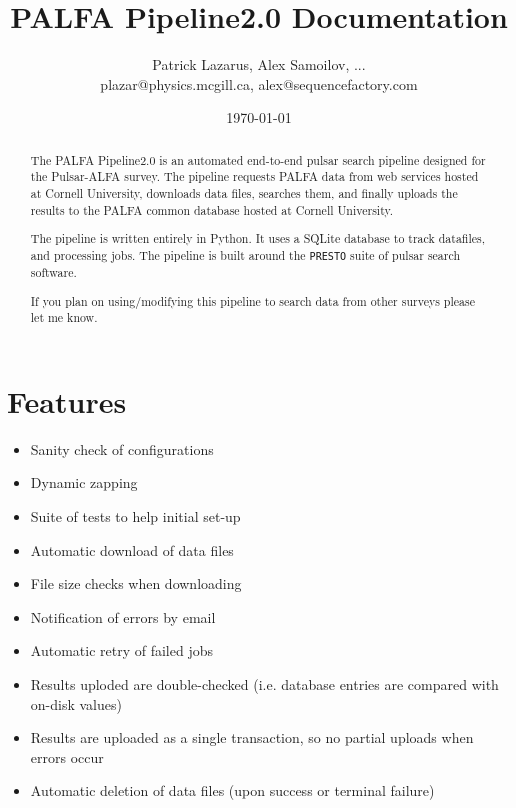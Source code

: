\documentclass[12pt]{article}
\begin{document}
\title{PALFA Pipeline2.0 Documentation}
\author{Patrick Lazarus, Alex Samoilov, ... \\
        plazar@physics.mcgill.ca, alex@sequencefactory.com}
\date{\today}

\maketitle

\begin{abstract}
The PALFA Pipeline2.0 is an automated end-to-end pulsar search pipeline designed for the Pulsar-ALFA survey. The pipeline requests PALFA data from web services hosted at Cornell University, downloads data files, searches them, and finally uploads the results to the PALFA common database hosted at Cornell University.

The pipeline is written entirely in Python. It uses a SQLite database to track datafiles, and processing jobs. The pipeline is built around the \texttt{PRESTO} suite of pulsar search software. 

If you plan on using/modifying this pipeline to search data from other surveys please let me know.

\end{abstract}

\clearpage

\tableofcontents

\clearpage

\section{Features}
\begin{itemize}
    \item Sanity check of configurations
    \item Dynamic zapping
    \item Suite of tests to help initial set-up
    \item Automatic download of data files
    \item File size checks when downloading
    \item Notification of errors by email
    \item Automatic retry of failed jobs
    \item Results uploded are double-checked (i.e. database entries are compared with on-disk values)
    \item Results are uploaded as a single transaction, so no partial uploads when errors occur
    \item Automatic deletion of data files (upon success or terminal failure)
\end{itemize}
\end{document}
